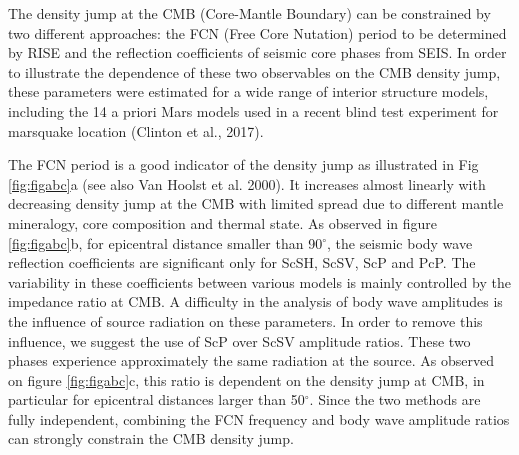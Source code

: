 The density jump at the CMB (Core-Mantle Boundary) can be constrained by two different approaches: the FCN (Free Core Nutation) period to be determined by RISE and the reflection coefficients of seismic core phases from SEIS. In order to illustrate the dependence of these two observables on the CMB density jump, these parameters were estimated for a wide range of interior structure models, including the 14 a priori Mars models used in a recent blind test experiment for marsquake location (Clinton et al., 2017).

The FCN period is a good indicator of the density jump as illustrated in Fig \ref{fig:figabc}a (see also Van Hoolst et al. 2000). It increases almost linearly with decreasing density jump at the CMB with limited spread due to different mantle mineralogy, core composition and thermal state. As observed in figure \ref{fig:figabc}b, for epicentral distance smaller than 90$^{\circ}$, the seismic body wave reflection coefficients are significant only for ScSH, ScSV, ScP and PcP. The variability in these coefficients between various models is mainly controlled by the impedance ratio at CMB. A difficulty in the analysis of body wave amplitudes is the influence of source radiation on these parameters. In order to remove this influence, we suggest the use of ScP over ScSV amplitude ratios. These two phases experience approximately the same radiation at the source. As observed on figure \ref{fig:figabc}c, this ratio is dependent on the density jump at CMB, in particular for epicentral distances larger than 50$^{\circ}$.
Since the two methods are fully independent, combining the FCN frequency and body wave amplitude ratios can strongly constrain the CMB density jump.

